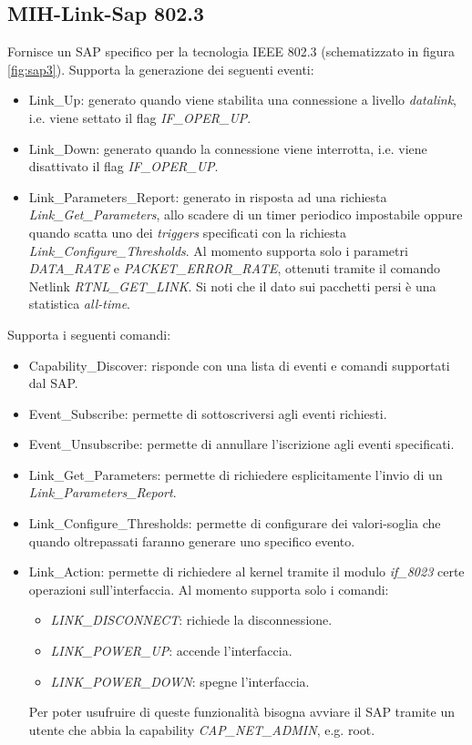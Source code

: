 \subsection{MIH-Link-Sap 802.3}
Fornisce un SAP specifico per la tecnologia IEEE 802.3 (schematizzato in figura \ref{fig:sap3}). Supporta la generazione dei seguenti eventi:
\begin{itemize}
\item Link\_Up: generato quando viene stabilita una connessione a livello {\em datalink}, i.e. viene settato il flag {\em IF\_OPER\_UP}.
\item Link\_Down: generato quando la connessione viene interrotta, i.e. viene disattivato il flag {\em IF\_OPER\_UP}.
\item Link\_Parameters\_Report: generato in risposta ad una richiesta \\{\em Link\_Get\_Parameters}, allo scadere di un timer periodico impostabile oppure quando scatta uno dei {\em triggers} specificati con la richiesta {\em Link\_Configure\_Thresholds}. Al momento supporta solo i parametri {\em DATA\_RATE} e {\em PACKET\_ERROR\_RATE}, ottenuti tramite il comando Netlink {\em RTNL\_GET\_LINK}. Si noti che il dato sui pacchetti persi è una statistica {\em all-time}.
\end{itemize}
Supporta i seguenti comandi:
\begin{itemize}
\item Capability\_Discover: risponde con una lista di eventi e comandi supportati dal SAP.
\item Event\_Subscribe: permette di sottoscriversi agli eventi richiesti.
\item Event\_Unsubscribe: permette di annullare l'iscrizione agli eventi specificati.
\item Link\_Get\_Parameters: permette di richiedere esplicitamente l'invio di un {\em Link\_Parameters\_Report}.
\item Link\_Configure\_Thresholds: permette di configurare dei valori-soglia che quando oltrepassati faranno generare uno specifico evento.
\item Link\_Action: permette di richiedere al kernel tramite il modulo {\em if\_8023} certe operazioni sull'interfaccia. Al momento supporta solo i comandi:
\begin{itemize}
\item {\em LINK\_DISCONNECT}: richiede la disconnessione.
\item {\em LINK\_POWER\_UP}: accende l'interfaccia.
\item {\em LINK\_POWER\_DOWN}: spegne l'interfaccia.
\end{itemize}
Per poter usufruire di queste funzionalità bisogna avviare il SAP tramite un utente che abbia la capability {\em CAP\_NET\_ADMIN}, e.g. root.
\end{itemize}

